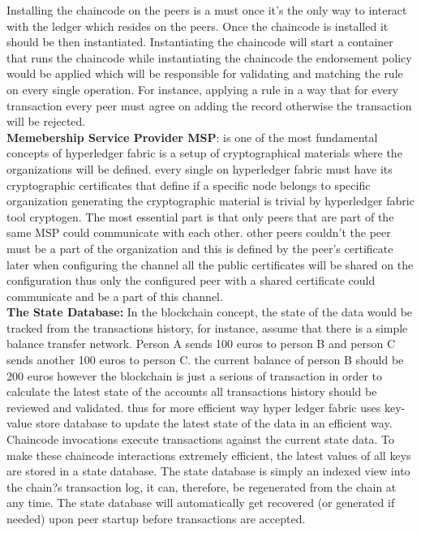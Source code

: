 Installing the chaincode on the peers is a must once it's the only way to interact with the ledger which resides on the peers. 
Once the chaincode is installed it should be then instantiated. 
Instantiating the chaincode will start a container that runs the chaincode while instantiating the chaincode the endorsement policy would be applied which will be responsible for validating and matching the rule on every single operation. For instance, applying a rule in a way  that for every transaction every peer must agree on adding the record otherwise the transaction will be rejected. \\
 
\textbf{Memebership Service Provider MSP}: is one of the most fundamental concepts of hyperledger fabric is a setup of cryptographical materials where the organizations will be defined. every single on hyperledger fabric must have its cryptographic certificates that define if a specific node belongs to specific organization generating the cryptographic material is trivial by hyperledger fabric tool cryptogen. 
The most essential part is that only peers that are part of the same MSP could communicate with each other. other peers couldn't the peer must be a part of the organization and this is defined by the peer's certificate later when configuring the channel all the public certificates will be shared on the configuration thus only the configured peer with a shared certificate could communicate and be a part of this channel. \\

\textbf{The State Database:} In the blockchain concept, the state of the data would be tracked from the transactions history, for instance, assume that there is a simple balance transfer network. Person A sends 100 euros to person B and person C sends another 100 euros to person C. the current balance of person B should be 200 euros however the blockchain is just a serious of transaction in order to calculate the latest state of the accounts all transactions history should be reviewed and validated. thus for more efficient way hyper ledger fabric uses key-value store database to update the latest state of the data in an efficient way.
Chaincode invocations execute transactions against the current state data. To make these chaincode interactions extremely efficient, the latest values of all keys are stored in a state database. The state database is simply an indexed view into the chain?s transaction log, it can, therefore, be regenerated from the chain at any time. The state database will automatically get recovered (or generated if needed) upon peer startup before transactions are accepted.\\

